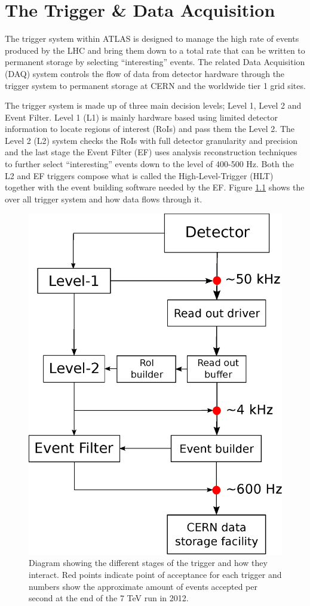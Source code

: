 \chapter{The Trigger \& Data Acquisition}

	The trigger system within ATLAS is designed to manage the high rate of events produced by the LHC and bring them down to a total rate that can be written to permanent storage by selecting ``interesting'' events. The related Data Acquisition (DAQ) system controls the flow of data from detector hardware through the trigger system to permanent storage at CERN and the worldwide tier 1 grid sites. 

	The trigger system is made up of three main decision levels; Level 1, Level 2 and Event Filter. Level 1 (L1) is mainly hardware based using limited detector information to locate regions of interest (RoIs) and pass them the Level 2. The Level 2 (L2) system checks the RoIs with full detector granularity and precision and the last stage the Event Filter (EF) uses analysis reconstruction techniques to further select ``interesting'' events down to the level of 400-500 Hz. Both the L2 and EF triggers compose what is called the High-Level-Trigger (HLT) together with the event building software needed by the EF. Figure \ref{fig:triggerFlow} shows the over all trigger system and how data flows through it.

	\begin{figure}[h]
        \begin{center}
            \includegraphics[width=0.7\linewidth]{images/Trigger_system.eps}
        \end{center}
        \caption{Diagram showing the different stages of the trigger and how they interact. Red points indicate point of acceptance for each trigger and numbers show the approximate amount of events accepted per second at the end of the 7 TeV run in 2012.}
        \label{fig:triggerFlow}
    \end{figure}


